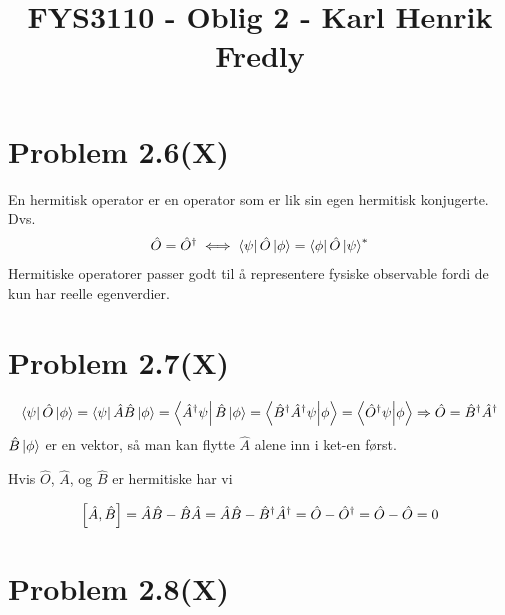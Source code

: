\documentclass[norsk,a4paper,12pt]{article}
\title{FYS3110 - Oblig 2 - Karl Henrik Fredly}
\begin{document}
	
	\maketitle
	
	\section*{Problem 2.6(X)}
	
		En hermitisk operator er en operator som er lik sin egen hermitisk konjugerte. Dvs.
		\begin{equation}
		\begin{aligned}
		\hat{O} = \hat{O}^\dagger \iff \bra{\psi}\hat{O}\ket{\phi} = \bra{\phi}\hat{O}\ket{\psi}^*
		\end{aligned}
		\end{equation}
		Hermitiske operatorer passer godt til å representere fysiske observable fordi de kun har reelle egenverdier.
	
	\section*{Problem 2.7(X)}
	
		\begin{equation}
		\begin{aligned}
		\bra{\psi}\hat{O}\ket{\phi} = \bra{\psi}\hat{A}\hat{B}\ket{\phi}
		= \bra{\hat{A}^\dagger\psi}\hat{B}\ket{\phi} = \bra{\hat{B}^\dagger\hat{A}^\dagger\psi}\ket{\phi}
		= \bra{\hat{O}^\dagger\psi}\ket{\phi}
		\Rightarrow \hat{O} = \hat{B}^\dagger\hat{A}^\dagger
		\end{aligned}
		\end{equation}
		$\hat{B}\ket{\phi}$ er en vektor, så man kan flytte $\hat{A}$ alene inn i ket-en først.
	
		Hvis $\hat{O}$, $\hat{A}$, og $\hat{B}$ er hermitiske har vi
		
		\begin{equation}
		\begin{aligned}
		\comm{\hat{A}}{\hat{B}} = \hat{A}\hat{B} - \hat{B}\hat{A} = \hat{A}\hat{B} - \hat{B}^\dagger\hat{A}^\dagger
		= \hat{O} - \hat{O}^\dagger = \hat{O} - \hat{O} = 0
		\end{aligned}
		\end{equation}
		
	\section*{Problem 2.8(X)}
		
\end{document}
